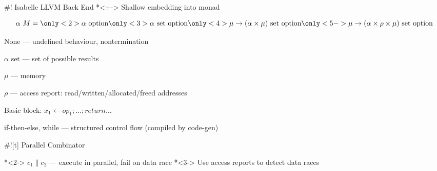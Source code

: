 \documentclass[fleqn]{beamer}
\begin{document}


#! Isabelle LLVM Back End
  *<+-> Shallow embedding into monad 

  \[\alpha~M =
    \only<2>{\alpha\textrm{ option}}
    \only<3>{\alpha \textrm{ set option}}
    \only<4>{\mu \to (\alpha\times\mu) \textrm{ set option} }
    \only<5->{\mu \to (\alpha\times\rho\times\mu) \textrm{ set option} }
  \]

   None --- undefined behaviour, nontermination

   $\alpha$ set --- set of possible results

   $\mu$ --- memory

   $\rho$ --- access report: read/written/allocated/freed addresses


  \hfill

  Basic block: $x_1 \leftarrow op_1; \ldots; return \ldots$


  if-then-else, while --- structured control flow (compiled by code-gen)

#![t] Parallel Combinator
  \newcommand{\mknd}[1]{\makebox[0pt]{\tikz[remember picture]{\node (#1) {};}}}

  *<2-> $c_1 \parallel c_2$ --- execute in parallel, fail on data race
  *<3-> Use access reports to detect data races

\end{document}
